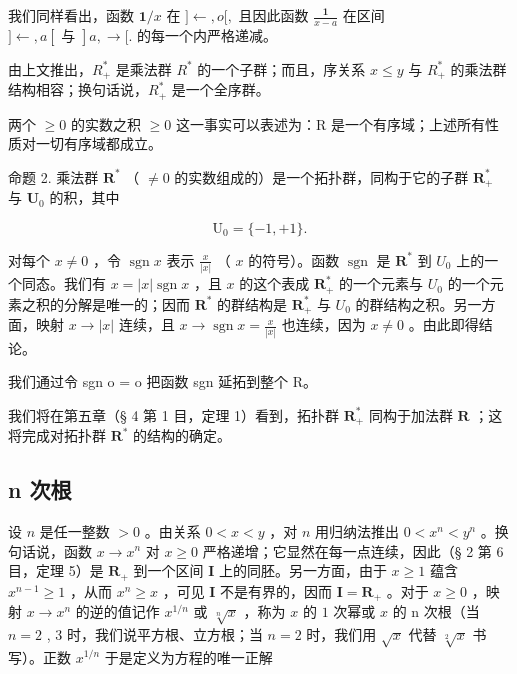 我们同样看出，函数 \(\mathbf{1} / x\) 在 \(] \leftarrow, o[, \text{ 且因此函数 } \frac{\mathbf{1}}{x - a}\) 在区间 \(] \leftarrow, a[ \text{ 与 } ]a, \rightarrow [.\) 的每一个内严格递减。

由上文推出，\(R_{+}^{*}\) 是乘法群 \(R^{*}\) 的一个子群；而且，序关系 \(x \leqslant y\) 与 \(R_{+}^{*}\) 的乘法群结构相容；换句话说，\(R_{+}^{*}\) 是一个全序群。

两个 \(\geqslant0\) 的实数之积 \(\geqslant0\) 这一事实可以表述为：R 是一个有序域；上述所有性质对一切有序域都成立。

命题 2. 乘法群 \(\mathbf{R}^{*}\) （ \(\neq 0\) 的实数组成的）是一个拓扑群，同构于它的子群 \(\mathbf{R}_{+}^{*}\) 与 \(\mathbf{U}_{0}\) 的积，其中

\[
\mathrm{U} _ {0} = \{- 1, + 1 \}.
\]

对每个 \(x \neq 0\) ，令 \(\operatorname{sgn} x\) 表示 \(\frac{x}{|x|}\) （ \(x\) 的符号）。函数 \(\operatorname{sgn}\) 是 \(\mathbf{R}^*\) 到 \(U_0\) 上的一个同态。我们有 \(x = |x| \operatorname{sgn} x\) ，且 \(x\) 的这个表成 \(\mathbf{R}_+^*\) 的一个元素与 \(U_0\) 的一个元素之积的分解是唯一的；因而 \(\mathbf{R}^*\) 的群结构是 \(\mathbf{R}_+^*\) 与 \(U_0\) 的群结构之积。另一方面，映射 \(x \to |x|\) 连续，且 \(x \to \operatorname{sgn} x = \frac{x}{|x|}\) 也连续，因为 \(x \neq 0\) 。由此即得结论。

我们通过令 sgn o = o 把函数 sgn 延拓到整个 R。

我们将在第五章（§ 4 第 1 目，定理 1）看到，拓扑群 \(\mathbf{R}_{+}^{*}\) 同构于加法群 \(\mathbf{R}\) ；这将完成对拓扑群 \(\mathbf{R}^{*}\) 的结构的确定。

\subsection{n 次根}

设 \(n\) 是任一整数 \(> 0\) 。由关系 \(0 < x < y\) ，对 \(n\) 用归纳法推出 \(0 < x^n < y^n\) 。换句话说，函数 \(x \to x^n\) 对 \(x \geqslant 0\) 严格递增；它显然在每一点连续，因此（§ 2 第 6 目，定理 5）是 \(\mathbf{R}_{+}\) 到一个区间 \(\mathbf{I}\) 上的同胚。另一方面，由于 \(x \geqslant 1\) 蕴含 \(x^{n-1} \geqslant 1\) ，从而 \(x^n \geqslant x\) ，可见 \(\mathbf{I}\) 不是有界的，因而 \(\mathbf{I} = \mathbf{R}_{+}\) 。对于 \(x \geqslant 0\) ，映射 \(x \to x^n\) 的逆的值记作 \(x^{1/n}\) 或 \(\sqrt[n]{x}\) ，称为 \(x\) 的 \(1\) 次幂或 \(x\) 的 n 次根（当 \(n = 2\) , 3 时，我们说平方根、立方根；当 \(n = 2\) 时，我们用 \(\sqrt{x}\) 代替 \(\sqrt[2]{x}\) 书写）。正数 \(x^{1/n}\) 于是定义为方程的唯一正解

